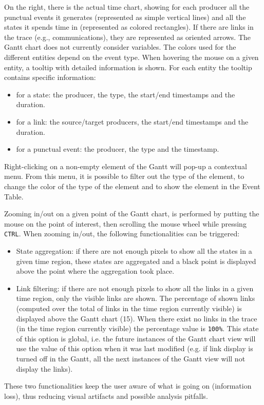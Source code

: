 \documentclass[twoside]{article}
\begin{document}
\begin{sloppypar}
On the right, there is the actual time chart, showing for each producer all the punctual events it generates (represented as simple vertical lines) and all the states it spends time in (represented as colored rectangles). 
If there are links in the trace (e.g., communications), they are represented as oriented arrows.
The Gantt chart does not currently consider variables.
The colors used for the different entities depend on the event type.
When hovering the mouse on a given entity, a tooltip with detailed information is shown.
For each entity the tooltip contains specific information:
\begin{itemize}
 \item for a state: the producer, the type, the start/end timestamps and the duration.
 \item for a link: the source/target producers, the start/end timestamps and the duration.
 \item for a punctual event: the producer, the type and the timestamp.
\end{itemize}

Right-clicking on a non-empty element of the Gantt will pop-up a contextual menu.
From this menu, it is possible to filter out the type of the element, to change the color of the type of the element and to show the element in the Event Table.

Zooming in/out on a given point of the Gantt chart, is performed by putting the mouse on the point of interest, then scrolling the mouse wheel while pressing \texttt{CTRL}.
When zooming in/out, the following functionalities can be triggered:
\begin{itemize}
 \item State aggregation: if there are not enough pixels to show all the states in a given time region, these states are aggregated and a black point is displayed above the point where the aggregation took place. 
 \item Link filtering: if there are not enough pixels to show all the links in a given time region, only the visible links are shown. 
 The percentage of shown links (computed over the total of links in the time region currently visible) is displayed above the Gantt chart (\num{15}).
 When there exist no links in the trace (in the time region currently visible) the percentage value is \texttt{100\%}. This state of this option is global, i.e. the future instances of the Gantt chart view will use the value of this option when it was last modified (e.g. if link display is turned off in the Gantt, all the next instances of the Gantt view will not display the links). 
\end{itemize}
These two functionalities keep the user aware of what is going on (information loss), thus reducing visual artifacts and possible analysis pitfalls.


\end{sloppypar}
\end{document}

